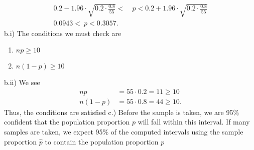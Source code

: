 \documentclass{report}
\begin{document}
\begin{align*}
    0.2 - 1.96 \cdot \sqrt{0.2 \cdot \frac{0.8}{55}} <\ &p < 0.2 + 1.96 \cdot \sqrt{0.2 \cdot \frac{0.8}{55}} \\
    0.0943 <\ p < 0.3057
.\end{align*}
\bigbreak \noindent 
b.i) The conditions we must check are 
\begin{enumerate}
    \item $np \geq 10 $
    \item $n(1-p) \geq 10$
\end{enumerate}
b.ii) We see
\begin{align*}
    np &= 55 \cdot 0.2 = 11 \geq 10 \\
    n(1-p) &=55 \cdot 0.8 = 44 \geq 10
.\end{align*}
Thus, the conditions are satisfied
\bigbreak \noindent 
c.) Before the sample is taken, we are 95\% confident that the population proportion $p$ will fall within this interval. If many samples are taken, we expect 95\% of the computed intervals using the sample proportion $\hat{p}$ to contain the population proportion $p$
\end{document}
